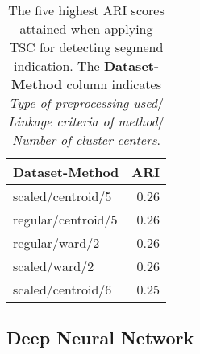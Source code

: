\begin{table*}
    \centering
    \begin{tabular}{lr}
        \toprule
        Dataset-Method     &  ARI \\
        \midrule
        scaled/centroid/5  & 0.26 \\
        regular/centroid/5 & 0.26 \\
        regular/ward/2     & 0.26 \\
        scaled/ward/2      & 0.26 \\
        scaled/centroid/6  & 0.25 \\
        \bottomrule
    \end{tabular}
    \caption{The five highest ARI scores attained when applying TSC for detecting segmend indication.
             The \textbf{Dataset-Method} column indicates \textit{Type of preprocessing used}$/$\textit{Linkage criteria of method}$/$\textit{Number of cluster centers}.}
    \label{tab:pvc_ind_ari}
\end{table*}

\begin{comment}
\textbf{ARI PARAGRAPH. ONLY FOR CLUSTERING METHODS}.
[ ] \textbf{Comment on the spread of ARI scores. Be specific since the distribution plots are ommitted}
[ ] \textbf{Comment on the general trends of high performing methods in terms of ARI - are they the same trends as scores performing high in terms of DOR?}
[ ] \textbf{Comment on whether the methods in the top 5 ARIs are the same methods with the highest DOR. If not, mention it.}
[ ] \textbf{If the top 1 or 2 ARIs are also top in DOR no further discussion is needed. You can then plot some of the cluster realizations to see what they look like.}
[ ] \textbf{If NOT, why do they differ? Is the method with the highest ARI evaluated at a higher cluster number that 2? Attempt to visualize it, if it is not too difficult.}
[ ] \textbf{Plot some visualizations of the clustering, and comment on them.}
[ ] \textbf{Make arguments for and against the top three methods in terms of accuracy, sensitivity, specificity, DOR, ARI and potentially the plots, and make an informed choice.}
\end{comment}

\newpage

\subsection{Deep Neural Network}

